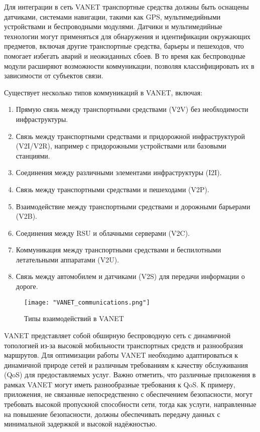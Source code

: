 Для интеграции в сеть VANET транспортные средства должны быть оснащены датчиками, системами навигации, такими как GPS, мультимедийными устройствами и беспроводными модулями. Датчики и мультимедийные технологии могут применяться для обнаружения и идентификации окружающих предметов, включая другие транспортные средства, барьеры и пешеходов, что помогает избегать аварий и неожиданных сбоев. В то время как беспроводные модули расширяют возможности коммуникации, позволяя классифицировать их в зависимости от субъектов связи.

Существует несколько типов коммуникаций в VANET, включая:
\begin{enumerate}
    \item Прямую связь между транспортными средствами (V2V) без необходимости инфраструктуры.
    \item Связь между транспортными средствами и придорожной инфраструктурой (V2I/V2R), например с придорожными устройствами или базовыми станциями.
    \item Соединения между различными элементами инфраструктуры (I2I).
    \item Связь между транспортными средствами и пешеходами (V2P).
    \item Взаимодействие между транспортными средствами и дорожными барьерами (V2B).
    \item Соединения между RSU и облачными серверами (V2C).
    \item Коммуникация между транспортными средствами и беспилотными летательными аппаратами (V2U).
    \item Связь между автомобилем и датчиками (V2S) для передачи информации о дороге.
\end{enumerate}

\begin{figure}[!h]
    \centering
    \texttt{[image: "VANET\_communications.png"]}
    \caption{Типы взаимодействий в VANET}
    \label{fig:vanet_communications}
\end{figure}

VANET представляет собой обширную беспроводную сеть с динамичной топологией из-за высокой мобильности транспортных средств и разнообразия маршрутов. Для оптимизации работы VANET необходимо адаптироваться к динамичной природе сетей и различным требованиям к качеству обслуживания (QoS) для предоставляемых услуг. Важно отметить, что различные приложения в рамках VANET могут иметь разнообразные требования к QoS. К примеру, приложения, не связанные непосредственно с обеспечением безопасности, могут требовать высокой пропускной способности сети, тогда как услуги, направленные на повышение безопасности, должны обеспечивать передачу данных с минимальной задержкой и высокой надёжностью.


